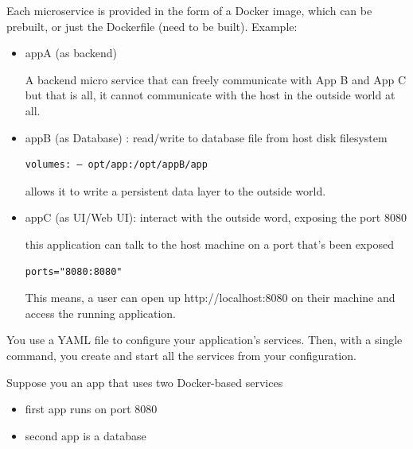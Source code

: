 Each microservice is provided in the form of a Docker image, which can be
prebuilt, or just the Dockerfile (need to be built).
Example: 
\begin{itemize}
  \item appA (as backend)
  
 A backend micro service that can freely communicate with App B and App C but
 that is all, it cannot communicate with the host in the outside world at all.
 
  \item appB (as Database) : read/write to database file from host disk filesystem

\begin{verbatim}
volumes: — opt/app:/opt/appB/app
\end{verbatim}
allows it to write a persistent data layer to the outside world. 
  
  \item appC (as UI/Web UI): interact with the outside word, exposing the port 8080

this application can talk to the host machine on a port that’s been exposed
\begin{verbatim}
ports="8080:8080"
\end{verbatim}
This means, a user can open up http://localhost:8080 on their machine and access the running application.
  
\end{itemize}

You use a YAML file to configure your application’s services. Then, with a
single command, you create and start all the services from your configuration.

Suppose you an app that uses two Docker-based services
\begin{itemize}
  \item first app runs on port 8080
  
  \item second app is a database
\end{itemize}

